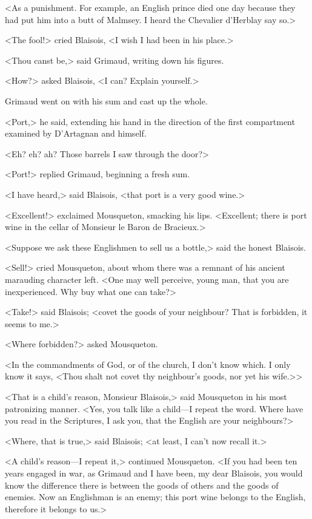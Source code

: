 <As a punishment. For example, an English prince died one day because they had put him into a butt of Malmsey. I heard the Chevalier d'Herblay say so.>

<The fool!> cried Blaisois, <I wish I had been in his place.>

<Thou canst be,> said Grimaud, writing down his figures.

<How?> asked Blaisois, <I can? Explain yourself.>

Grimaud went on with his sum and cast up the whole.

<Port,> he said, extending his hand in the direction of the first compartment examined by D'Artagnan and himself.

<Eh? eh? ah? Those barrels I saw through the door?>

<Port!> replied Grimaud, beginning a fresh sum.

<I have heard,> said Blaisois, <that port is a very good wine.>

<Excellent!> exclaimed Mousqueton, smacking his lips. <Excellent; there is port wine in the cellar of Monsieur le Baron de Bracieux.>

<Suppose we ask these Englishmen to sell us a bottle,> said the honest Blaisois.

<Sell!> cried Mousqueton, about whom there was a remnant of his ancient marauding character left. <One may well perceive, young man, that you are inexperienced. Why buy what one can take?>

<Take!> said Blaisois; <covet the goods of your neighbour? That is forbidden, it seems to me.>

<Where forbidden?> asked Mousqueton.

<In the commandments of God, or of the church, I don't know which. I only know it says, <Thou shalt not covet thy neighbour's goods, nor yet his wife.>>

<That is a child's reason, Monsieur Blaisois,> said Mousqueton in his most patronizing manner. <Yes, you talk like a child—I repeat the word. Where have you read in the Scriptures, I ask you, that the English are your neighbours?>

<Where, that is true,> said Blaisois; <at least, I can't now recall it.>

<A child's reason—I repeat it,> continued Mousqueton. <If you had been ten years engaged in war, as Grimaud and I have been, my dear Blaisois, you would know the difference there is between the goods of others and the goods of enemies. Now an Englishman is an enemy; this port wine belongs to the English, therefore it belongs to us.>

